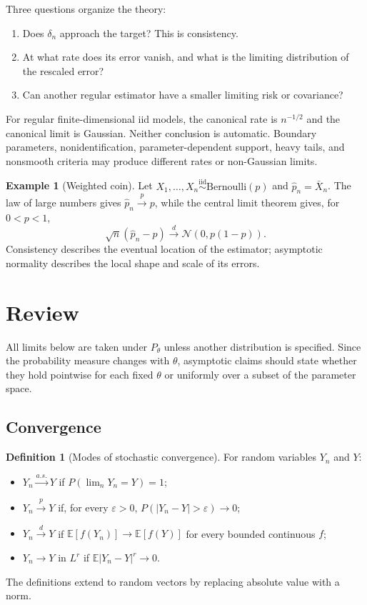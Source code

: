 \documentclass[12pt,oneside]{book}
\numberwithin{equation}{section}
\theoremstyle{definition}
\newtheorem{definition}{Definition}[section]
\newtheorem{example}{Example}[section]
\theoremstyle{plain}
\theoremstyle{remark}
\newcommand{\E}{\mathbb{E}}
\newcommand{\iid}{\overset{\text{iid}}{\sim}}
\newcommand{\convd}{\overset{d}{\to}}
\newcommand{\convp}{\overset{p}{\to}}
\newcommand{\as}{\overset{a.s.}{\to}}
\newcommand{\abs}[1]{\left\lvert #1 \right\rvert}
\newcommand{\Normal}{\mathcal{N}}
\newcommand{\Bern}{\mathrm{Bernoulli}}
\begin{document}
Three questions organize the theory:
\begin{enumerate}
    \item Does $\delta_n$ approach the target?  This is consistency.
    \item At what rate does its error vanish, and what is the limiting
    distribution of the rescaled error?
    \item Can another regular estimator have a smaller limiting risk or
    covariance?
\end{enumerate}

For regular finite-dimensional iid models, the canonical rate is
$n^{-1/2}$ and the canonical limit is Gaussian.  Neither conclusion is
automatic.  Boundary parameters, nonidentification, parameter-dependent
support, heavy tails, and nonsmooth criteria may produce different rates or
non-Gaussian limits.

\begin{example}[Weighted coin]
Let $X_1,\ldots,X_n\iid\Bern(p)$ and $\widehat p_n=\bar X_n$.  The law of
large numbers gives $\widehat p_n\convp p$, while the central limit theorem
gives, for $0<p<1$,
\[
    \sqrt n(\widehat p_n-p)
    \convd\Normal(0,p(1-p)).
\]
Consistency describes the eventual location of the estimator; asymptotic
normality describes the local shape and scale of its errors.
\end{example}

\section{Review}

All limits below are taken under $P_\theta$ unless another distribution is
specified.  Since the probability measure changes with $\theta$, asymptotic
claims should state whether they hold pointwise for each fixed $\theta$ or
uniformly over a subset of the parameter space.

\subsection{Convergence}

\begin{definition}[Modes of stochastic convergence]
For random variables $Y_n$ and $Y$:
\begin{itemize}
    \item $Y_n\as Y$ if $P(\lim_nY_n=Y)=1$;
    \item $Y_n\convp Y$ if, for every $\varepsilon>0$,
    $P(\abs{Y_n-Y}>\varepsilon)\to0$;
    \item $Y_n\convd Y$ if
    $\E[f(Y_n)]\to\E[f(Y)]$ for every bounded continuous $f$;
    \item $Y_n\to Y$ in $L^r$ if
    $\E\abs{Y_n-Y}^r\to0$.
\end{itemize}
The definitions extend to random vectors by replacing absolute value with a
norm.
\end{definition}
\end{document}
